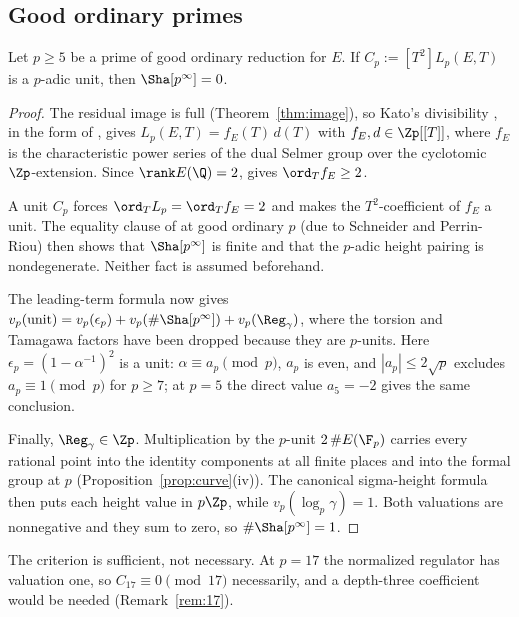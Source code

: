 \subsection{Good ordinary primes}
\begin{lemma}\label{lem:goodord}
Let $p\ge5$ be a prime of good ordinary reduction for $E$. If $C_p:=[T^2]L_p(E,T)$ is a $p$-adic unit, then $\Sha[p^\infty]=0$.
\end{lemma}
\begin{proof}
The residual image is full (Theorem~\ref{thm:image}), so Kato's divisibility \cite{kato}, in the form of \cite[Thm.~7.3]{sw}, gives $L_p(E,T)=f_E(T)\,d(T)$ with $f_E,d\in\Zp[[T]]$, where $f_E$ is the characteristic power series of the dual Selmer group over the cyclotomic $\Zp$-extension. Since $\rank E(\Q)=2$, \cite[Thm.~6.1]{sw} gives $\ord_Tf_E\ge2$.

A unit $C_p$ forces $\ord_TL_p=\ord_Tf_E=2$ and makes the $T^2$-coefficient of $f_E$ a unit. The equality clause of \cite[Thm.~6.1]{sw} at good ordinary $p$ (due to Schneider and Perrin-Riou) then shows that $\Sha[p^\infty]$ is finite and that the $p$-adic height pairing is nondegenerate. Neither fact is assumed beforehand.

The leading-term formula now gives $v_p(\text{unit})=v_p(\epsilon_p)+v_p(\#\Sha[p^\infty])+v_p(\Reg_\gamma)$, where the torsion and Tamagawa factors have been dropped because they are $p$-units. Here $\epsilon_p=(1-\alpha^{-1})^2$ is a unit: $\alpha\equiv a_p\pmod p$, $a_p$ is even, and $|a_p|\le2\sqrt p$ excludes $a_p\equiv1\pmod p$ for $p\ge7$; at $p=5$ the direct value $a_5=-2$ gives the same conclusion.

Finally, $\Reg_\gamma\in\Zp$. Multiplication by the $p$-unit $2\,\#E(\F_p)$ carries every rational point into the identity components at all finite places and into the formal group at $p$ (Proposition~\ref{prop:curve}(iv)). The canonical sigma-height formula \cite[\S4.1]{sw} then puts each height value in $p\Zp$, while $v_p(\log_p\gamma)=1$. Both valuations are nonnegative and they sum to zero, so $\#\Sha[p^\infty]=1$.
\end{proof}
The criterion is sufficient, not necessary. At $p=17$ the normalized regulator has valuation one, so $C_{17}\equiv0\pmod{17}$ necessarily, and a depth-three coefficient would be needed (Remark~\ref{rem:17}).

